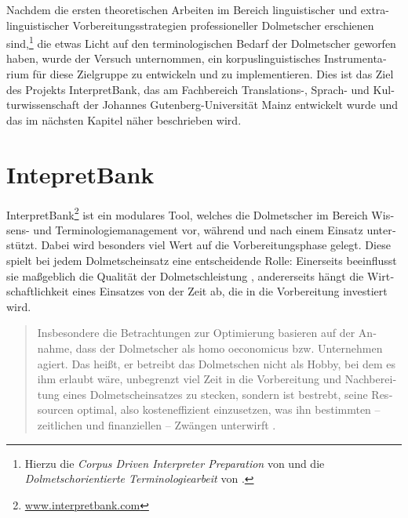 \documentclass[output=paper]{LSP/langsci}
\begin{document}
\begin{otherlanguage}{ngerman}
Nachdem die ersten theoretischen Arbeiten im Bereich linguistischer und extra-linguistischer Vorbereitungsstrategien professioneller Dolmetscher erschienen sind,\footnote{Hierzu die \textit{Corpus Driven Interpreter Preparation} von \citet{Fantinuoli2006} und die \textit{Dolmetschorientierte Terminologiearbeit} von \citet{Will2009}.} die etwas Licht auf den terminologischen Bedarf der Dolmetscher geworfen haben, wurde der Versuch unternommen, ein korpuslinguistisches Instrumentarium für diese Zielgruppe zu entwickeln und zu implementieren. Dies ist das Ziel des Projekts InterpretBank, das am Fachbereich Translations-, Sprach- und Kulturwissenschaft der Johannes Gutenberg-Universität Mainz entwickelt wurde und das im nächsten Kapitel näher beschrieben wird.

\section{IntepretBank}\label{sec:fantinuoli:6}

InterpretBank\footnote{\url{www.interpretbank.com}} ist ein modulares Tool, welches die Dolmetscher im Bereich Wissens- und Terminologiemanagement vor, während und nach einem Einsatz unterstützt. Dabei wird besonders viel Wert auf die Vorbereitungsphase gelegt. Diese spielt bei jedem Dolmetscheinsatz eine entscheidende Rolle: Einerseits beeinflusst sie maßgeblich die Qualität der Dolmetschleistung \citep[777]{Kalina2005}, andererseits hängt die Wirtschaftlichkeit eines Einsatzes von der Zeit ab, die in die Vorbereitung investiert wird. 

\begin{quote}
Insbesondere die Betrachtungen zur Optimierung basieren auf der Annahme, dass der Dolmetscher als homo oeconomicus bzw. Unternehmen agiert. Das heißt, er betreibt das Dolmetschen nicht als Hobby, bei dem es ihm erlaubt wäre, unbegrenzt viel Zeit in die Vorbereitung und Nachbereitung eines Dolmetscheinsatzes zu stecken, sondern ist bestrebt, seine Ressourcen optimal, also kosteneffizient einzusetzen, was ihn bestimmten -- zeitlichen und finanziellen -- Zwängen unterwirft \citep[5 ff]{Rütten2007}.
\end{quote}


\end{otherlanguage}
\end{document}
